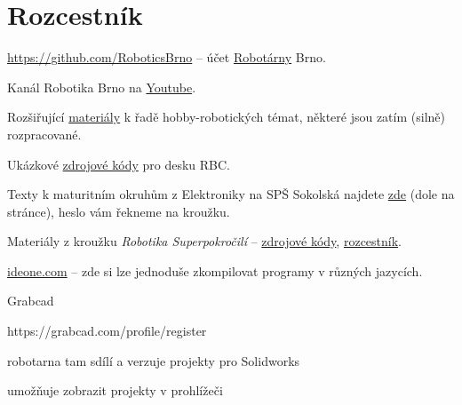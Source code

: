
\section{Rozcestník}

\url{https://github.com/RoboticsBrno} -- účet 
\href{http://helceletka.cz/robotarna/}{Robotárny} Brno. 

Kanál Robotika Brno na \href{https://www.youtube.com/channel/UCxLGjiNwJ9u7Wdb1kahaHgg}{Youtube}.

Rozšiřující \href{https://github.com/MiroslavBurda/dokumentace}{materiály} k řadě hobby-robotických témat, některé jsou zatím (silně) rozpracované.

Ukázkové  
\href{https://rbcontrol.robotikabrno.cz}{zdrojové kódy} pro desku RBC.

Texty k maturitním okruhům z Elektroniky na SPŠ Sokolská najdete 
\href{https://fyzika.websy.cz/pro-studenty}{zde} (dole na stránce),
 heslo vám řekneme na kroužku. 

Materiály z kroužku \textit{Robotika Superpokročilí} -- 
\href{https://github.com/RoboticsBrno/krouzek_esp32}{zdrojové kódy}, 
\href{https://drive.google.com/drive/folders/1-mSb9hWmVIwwD0cdacrCdjAM6yxdJjPa}
{rozcestník}.


\url{ideone.com} -- zde si lze jednoduše zkompilovat programy v různých jazycích.

Grabcad 

https://grabcad.com/profile/register

robotarna tam sdílí a verzuje projekty pro Solidworks

umožňuje zobrazit projekty v prohlížeči 
